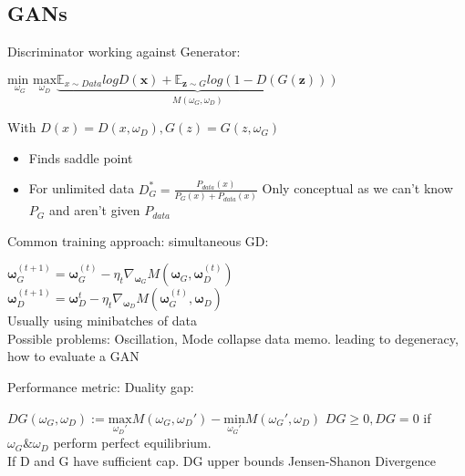 \subsection{GANs}

Discriminator working against Generator:
\begin{center}
    $\underset{\omega_G}{\text{min }}\underset{\omega_D}{\text{max}}\underbrace{\mathbb{E}_{x\sim Data}logD(\boldsymbol{x}) + \mathbb{E}_{\boldsymbol{z}\sim G}log(1-D(G(\boldsymbol{z})))}_{M(\omega_G,\omega_D)}$
\end{center}
With $D(x) = D(x,\omega_D), G(z) = G(z,\omega_G)$

\begin{itemize}
    \item Finds saddle point
    \item For unlimited data $D^*_G = \frac{P_{data}(x)}{P_G(x) + P_{data}(x)}$
    Only conceptual as we can't know $P_G$ and aren't given $P_{data}$
\end{itemize}

Common training approach: simultaneous GD:
\begin{center}
    $\boldsymbol{\omega}_G^{(t+1)} = \boldsymbol{\omega}_G^{(t)} - \eta_t\nabla_{\boldsymbol{\omega}_G}M(\boldsymbol{\omega}_G,\boldsymbol{\omega}_D^{(t)})$\\
    $\boldsymbol{\omega}_D^{(t+1)} = \boldsymbol{\omega}_D^t - \eta_t\nabla_{\boldsymbol{\omega}_D}M(\boldsymbol{\omega}_G^{(t)},\boldsymbol{\omega}_D)$\\
    Usually using minibatches of data\\
    Possible problems: Oscillation, Mode collapse%
    data memo. leading to degeneracy, how to evaluate a GAN
\end{center}
Performance metric: Duality gap:
\begin{center}
    $DG(\omega_G,\omega_D) := \underset{\omega_D'}{\text{max}}M(\omega_G,\omega_D') - \underset{\omega_G'}{\text{min}}M(\omega_G',\omega_D)$
    $DG \geq 0, DG = 0$ if $\omega_G \& \omega_D$ perform perfect equilibrium.\\
    If D and G have sufficient cap. DG upper bounds Jensen-Shanon Divergence
\end{center}